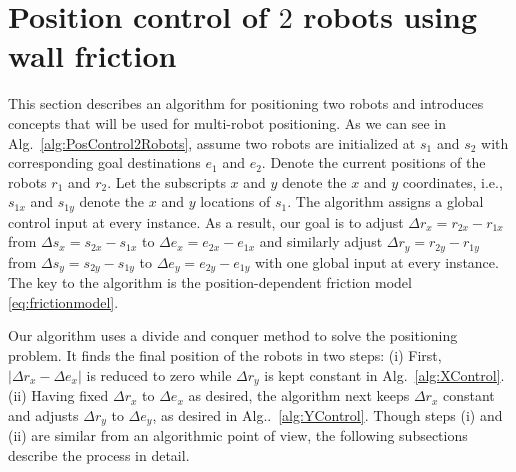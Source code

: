 \section{Position control of $2$ robots using wall friction}\label{sec:PostionControl2Robots}
This section describes an algorithm for positioning two robots and introduces concepts that will be used for multi-robot positioning.
As we can see in Alg.~\ref{alg:PosControl2Robots}, assume two robots are initialized at $s_1$ and $s_2$ with corresponding goal destinations $e_1$ and $e_2$. 
Denote the current positions of the robots  $r_1$ and $r_2$. 
Let the subscripts $x$ and $y$ denote the $x$ and $y$ coordinates, i.e., $s_{1x}$ and $s_{1y}$ denote the $x$ and $y$ locations of $s_1$. 
The algorithm assigns a global control input at every instance.
 As a result, our goal is to adjust 
 $\Delta r_x = r_{2x}-r_{1x}$ from $\Delta s_x = s_{2x}-s_{1x}$ to $\Delta e_x = e_{2x}-e_{1x}$ and similarly adjust 
 $\Delta r_y = r_{2y}-r_{1y}$ from $\Delta s_y = s_{2y}-s_{1y}$ to $\Delta e_y = e_{2y}-e_{1y}$ with one global input at every instance. 
 The key to the algorithm is the position-dependent friction model \eqref{eq:frictionmodel}.

Our algorithm uses a divide and conquer method to solve the positioning problem. 
It finds the final position of the robots in two steps: (i) First, $|\Delta r_x - \Delta e_x |$ is reduced to zero while  $\Delta r_y$ is kept constant in Alg.~\ref{alg:XControl}. 
(ii) Having fixed $\Delta r_x$ to $\Delta e_x$ as desired, the  algorithm next keeps $\Delta r_x$ constant and adjusts $\Delta r_y$ to $\Delta e_y$, as desired in Alg..~\ref{alg:YControl}. 
Though steps (i) and (ii) are similar from an algorithmic point of view, the following subsections describe the process in detail. 

